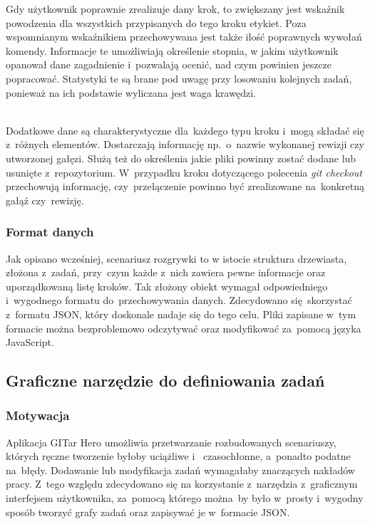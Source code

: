 \documentclass[12pt,a4paper,polish,thesis]{dcsbook}
\begin{document}
{\begin{description}
		Gdy użytkownik poprawnie zrealizuje dany krok, to zwiększany jest wskaźnik powodzenia dla wszystkich przypisanych do tego kroku etykiet. Poza wspomnianym wskaźnikiem przechowywana jest także ilość poprawnych wywołań komendy. Informacje te umożliwiają określenie stopnia, w jakim użytkownik opanował dane zagadnienie i~pozwalają ocenić, nad czym powinien jeszcze popracować. Statystyki te są brane pod uwagę przy losowaniu kolejnych zadań, ponieważ na ich podstawie wyliczana jest waga krawędzi.
		
		\item[Dodatkowe dane] \hfill \\
		Dodatkowe dane są charakterystyczne dla~każdego typu kroku i~mogą składać się z~różnych elementów. Dostarczają informację np.~o~nazwie wykonanej rewizji czy utworzonej gałęzi. Służą też do określenia jakie pliki powinny zostać dodane lub usunięte z~repozytorium. W~przypadku kroku dotyczącego polecenia \textit{git checkout} przechowują informację, czy~przełączenie powinno być zrealizowane na~konkretną gałąź czy~rewizję.
	\end{description}

	\subsubsection{Format danych}

	Jak opisano wcześniej, scenariusz rozgrywki to w istocie struktura drzewiasta, złożona z~zadań, przy~czym każde z~nich zawiera pewne informacje oraz uporządkowaną listę kroków. Tak złożony obiekt wymagał odpowiedniego i~wygodnego formatu do~przechowywania danych. Zdecydowano się~skorzystać z~formatu JSON, który doskonale nadaje się do tego celu. Pliki zapisane w~tym formacie można bezproblemowo odczytywać oraz modyfikować za~pomocą języka JavaScript.

	\subsection{Graficzne narzędzie do definiowania zadań}

	\subsubsection{Motywacja}

	Aplikacja GITar Hero umożliwia przetwarzanie rozbudowanych scenariuszy, których ręczne tworzenie byłoby uciążliwe i ~czasochłonne, a~ponadto podatne na~błędy. Dodawanie lub modyfikacja zadań wymagałaby znaczących nakładów pracy.
	Z~tego względu zdecydowano się na korzystanie z~narzędzia z~graficznym interfejsem użytkownika, za~pomocą którego można~by było w~prosty i~wygodny sposób tworzyć grafy zadań oraz zapisywać je w~formacie JSON.

}
\end{document}
